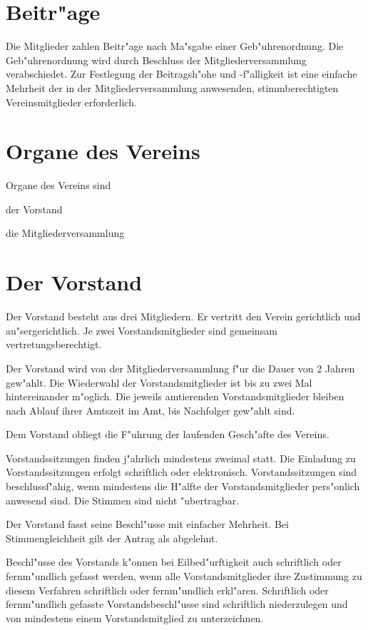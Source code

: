 \documentclass[a5paper, ngerman, 10pt]{scrreprt}
\begin{document}
\section{Beitr"age}
Die Mitglieder zahlen Beitr"age nach Ma"sgabe einer Geb"uhrenordnung. Die
Geb"uhrenordnung wird durch Beschluss der Mitgliederversammlung verabschiedet.
Zur Festlegung der Beitragsh"ohe und -f"alligkeit ist eine einfache Mehrheit der
in der Mitgliederversammlung anwesenden, stimmberechtigten Vereinsmitglieder
erforderlich.


\section{Organe des Vereins}
Organe des Vereins sind
\begin{compactenum}[a.]
    \item der Vorstand
    \item die Mitgliederversammlung
\end{compactenum}


\section{Der Vorstand}
\begin{compactenum}[(1)]
    \item Der Vorstand besteht aus drei Mitgliedern. Er vertritt den Verein
        gerichtlich und au"sergerichtlich. Je zwei Vorstandsmitglieder sind
        gemeinsam vertretungsberechtigt.
    \item Der Vorstand wird von der Mitgliederversammlung f"ur die Dauer von 2
        Jahren gew"ahlt. Die Wiederwahl der Vorstandsmitglieder ist bis zu zwei
        Mal hintereinander m"oglich. Die jeweils amtierenden Vorstandsmitglieder
        bleiben nach Ablauf ihrer Amtszeit im Amt, bis Nachfolger gew"ahlt sind.
    \item Dem Vorstand obliegt die F"uhrung der laufenden Gesch"afte des
        Vereins.
    \item Vorstandssitzungen finden j"ahrlich mindestens zweimal statt. Die
        Einladung zu Vorstandssitzungen erfolgt schriftlich oder elektronisch.
        Vorstandssitzungen sind beschlussf"ahig, wenn mindestens die H"alfte der
        Vorstandsmitglieder pers"onlich anwesend sind. Die Stimmen sind nicht
        "ubertragbar.
    \item Der Vorstand fasst seine Beschl"usse mit einfacher Mehrheit. Bei
        Stimmengleichheit gilt der Antrag als abgelehnt.
    \item Beschl"usse des Vorstands k"onnen bei Eilbed"urftigkeit auch
        schriftlich oder fernm"undlich gefasst werden, wenn alle
        Vorstandsmitglieder ihre Zustimmung zu diesem Verfahren schriftlich oder
        fernm"undlich erkl"aren.  Schriftlich oder fernm"undlich gefasste
        Vorstandsbeschl"usse sind schriftlich niederzulegen und von mindestens
        einem Vorstandsmitglied zu unterzeichnen.
\end{compactenum}
\end{document}
